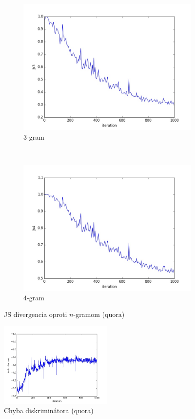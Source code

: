 \documentclass[10pt,a4paper]{article}
\begin{document}
\begin{figure}[H]
    \begin{subfigure}[b]{0.4\textwidth}
        \includegraphics[width=\textwidth]{quora/js3}
        \caption{$3$-gram}
    \end{subfigure}
    ~ 
    \begin{subfigure}[b]{0.4\textwidth}
        \includegraphics[width=\textwidth]{quora/js4}
        \caption{$4$-gram}
    \end{subfigure}
    \caption{JS divergencia oproti $n$-gramom (quora)}\label{fig:animals}
\end{figure}
\begin{figure}[H]
	\centering
	\includegraphics[width=0.5\textwidth]{quora/train_disc_cost}
    \caption{Chyba diskriminátora (quora) }
\end{figure}
\end{document}
